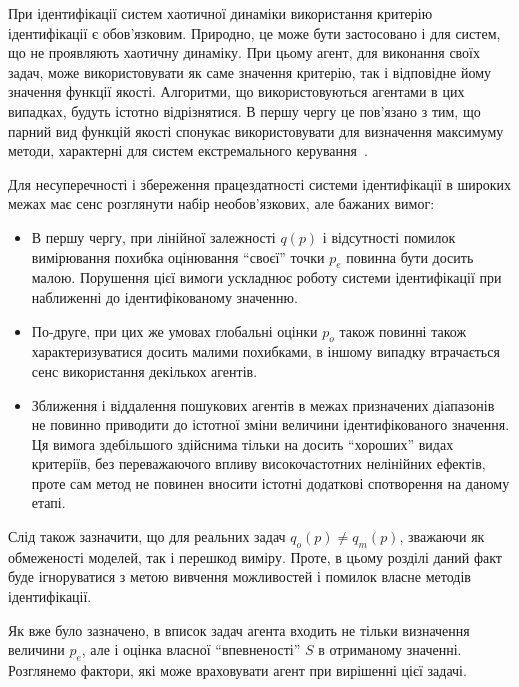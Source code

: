 При ідентифікації систем хаотичної динаміки використання
критерію ідентифікації є обов'язковим. Природно, це може
бути застосовано і для систем, що не проявляють хаотичну
динаміку. При цьому агент, для виконання своїх задач, може
використовувати як саме значення критерію, так і відповідне
йому значення функції якості. Алгоритми, що використовуються
агентами в цих випадках, будуть істотно відрізнятися. В першу
чергу це пов'язано з тим, що парний вид функцій якості спонукає
використовувати для визначення максимуму методи, характерні
для систем екстремального керування~\cite{rastr_seu}.

Для несуперечності і збереження працездатності системи
ідентифікації в широких межах має сенс розглянути набір
необов'язкових, але бажаних вимог:

\begin{itemize}

  \item
    В першу чергу, при лінійної залежності
    $q(p)$ і відсутності помилок вимірювання похибка оцінювання
    ``своєї'' точки
    $p_e$ повинна бути досить малою. Порушення цієї вимоги
    ускладнює роботу системи ідентифікації при наближенні до
    ідентифікованому значенню.

  \item
    По-друге, при цих же умовах глобальні оцінки
    $p_o$ також повинні також характеризуватися досить малими
    похибками, в іншому випадку втрачається сенс використання
    декількох агентів.

  \item
    Зближення і віддалення пошукових агентів в межах призначених
    діапазонів не повинно приводити до істотної зміни величини
    ідентифікованого значення. Ця вимога здебільшого здійснима
    тільки на досить ``хороших'' видах критеріїв, без переважаючого
    впливу високочастотних нелінійних ефектів, проте сам метод не
    повинен вносити істотні додаткові спотворення на даному етапі.

\end{itemize}

Слід також зазначити, що для реальних задач
$q_o(p) \ne q_m(p)$, зважаючи як обмеженості моделей, так і перешкод
виміру. Проте, в цьому розділі даний факт буде ігноруватися
з метою вивчення можливостей і помилок власне методів
ідентифікації.




Як вже було зазначено, в вписок задач агента входить не тільки
визначення величини
$p_e$, але і оцінка власної ``впевненості''
$S$ в отриманому значенні. Розглянемо фактори, які може враховувати
агент при вирішенні цієї задачі.

